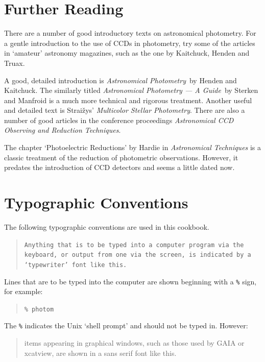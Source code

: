 \documentclass[twoside,11pt]{article}
\newcommand{\xlabel}[1]{}
\begin{document}
\section{\xlabel{FUREAD}\label{FUREAD}Further Reading}

There are a number of good introductory texts on astronomical
photometry.  For a gentle introduction to the use of CCDs in photometry,
try some of the articles in `amateur' astronomy magazines, such as the
one by Kaitchuck, Henden and Truax\cite{KAITCHUCK94}.

A good, detailed introduction is {\it Astronomical Photometry}\, by Henden
and Kaitchuck\cite{HENDEN90}.  The similarly titled {\it Astronomical
Photometry --- A Guide}\, by Sterken and Manfroid\cite{STERKEN92} is a
much more technical and rigorous treatment.  Another useful and detailed
text is Strai\v{z}ys' {\it Multicolor Stellar Photometry}\/\cite{STRAIZYS92}.
There are also a number of good articles in the conference proceedings {\it
Astronomical CCD Observing and Reduction Techniques}\/\cite{HOWELL92}.

The chapter `Photoelectric Reductions' by Hardie in {\it Astronomical
Techniques}\/\cite{HARDIE62} is a classic treatment of the reduction of
photometric observations.  However, it predates the introduction of CCD
detectors and seems a little dated now.


\section{\xlabel{TYPO}\label{TYPO}Typographic Conventions}

The following typographic conventions are used in this cookbook.

\begin{quote}
{\tt Anything that is to be typed into a computer program via the keyboard,
or output from one via the screen, is indicated by a `typewriter' font
like this.}
\end{quote}

Lines that are to be typed into the computer are shown beginning with a
{\tt{\%}} sign, for example:

\begin{quote}
{\tt \% photom}
\end{quote}

The {\tt{\%}} indicates the Unix `shell prompt' and should not be
typed in.  However:

\begin{quote}
{\sf items appearing in graphical windows, such as those used by GAIA
or xcatview, are shown in a sans serif font like this.}
\end{quote}
\end{document}
